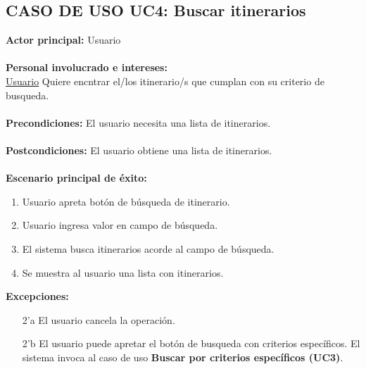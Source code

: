 \documentclass[11pt]{article}
\begin{document}
\subsection*{\textbf{CASO DE USO UC4:} Buscar itinerarios }
\textbf{Actor principal:} Usuario\\
\\
\textbf{Personal involucrado e intereses: }\\\underline{Usuario} Quiere encntrar el/los itinerario/s que cumplan con su criterio de busqueda.\\
\\
\textbf{Precondiciones:} El usuario necesita una lista de itinerarios.\\
\\
\textbf{Postcondiciones:} El usuario obtiene una lista de itinerarios.\\
\\
\textbf{Escenario principal de éxito:}
\begin{enumerate}
\item Usuario apreta botón de búsqueda de itinerario.
\item Usuario ingresa valor en campo de búsqueda.
\item El sistema busca itinerarios acorde al campo de búsqueda.
\item Se muestra al usuario una lista con itinerarios.
\end{enumerate}
\textbf{Excepciones:}
\begin{enumerate}
\item[2'a] El usuario cancela la operación.
\item[2'b] El usuario puede apretar el botón de busqueda con criterios específicos. El sistema invoca al caso de uso \textbf{Buscar por criterios específicos (UC3)}.
\end{enumerate}
\end{document}
